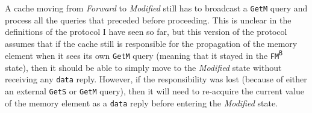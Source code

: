 A cache moving from \textit{Forward} to \textit{Modified} still has to broadcast
a \texttt{GetM} query and process all the queries that preceded before
proceeding. This is unclear in the definitions of the protocol I have seen so
far, but this version of the protocol assumes that if the cache still is
responsible for the propagation of the memory element when it sees its own
\texttt{GetM} query (meaning that it stayed in the
\texttt{FM\textsuperscript{B}} state), then it should be able to simply move to
the \textit{Modified} state without receiving any \texttt{data} reply. However,
if the responsibility was lost (because of either an external \texttt{GetS} or
\texttt{GetM} query), then it will need to re-acquire the current value of the
memory element as a \texttt{data} reply before entering the \textit{Modified}
state.
